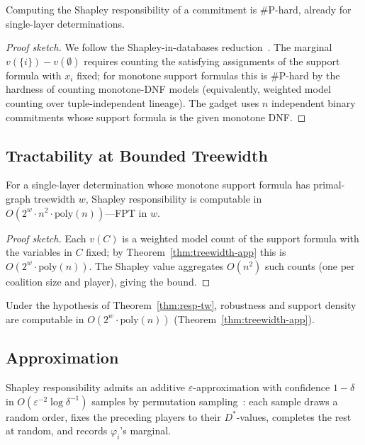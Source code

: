 \begin{theorem}[\#P-hardness]
  \label{thm:resp-hard}
  Computing the Shapley responsibility of a commitment is \#P-hard, already
  for single-layer determinations.
\end{theorem}
\begin{proof}[Proof sketch]
  We follow the Shapley-in-databases
  reduction~\cite{livshits2021shapley}. The marginal
  $v(\{i\}) - v(\emptyset)$ requires counting the satisfying assignments of
  the support formula with $x_i$ fixed; for monotone support formulas this is
  \#P-hard by the hardness of counting monotone-DNF models (equivalently,
  weighted model counting over tuple-independent lineage). The gadget uses $n$
  independent binary commitments whose support formula is the given monotone
  DNF.
\end{proof}

\subsection{Tractability at Bounded Treewidth}

\begin{theorem}
  \label{thm:resp-tw}
  For a single-layer determination whose monotone support formula has
  primal-graph treewidth $w$, Shapley responsibility is computable in
  $O(2^w \cdot n^2 \cdot \mathrm{poly}(n))$---FPT in $w$.
\end{theorem}
\begin{proof}[Proof sketch]
  Each $v(C)$ is a weighted model count of the support formula with the
  variables in $C$ fixed; by Theorem~\ref{thm:treewidth-app} this is
  $O(2^w \cdot \mathrm{poly}(n))$. The Shapley value aggregates
  $O(n^2)$ such counts (one per coalition size and player), giving the bound.
\end{proof}

\begin{corollary}
  \label{cor:robustness-fpt}
  Under the hypothesis of Theorem~\ref{thm:resp-tw}, robustness and support
  density are computable in $O(2^w \cdot \mathrm{poly}(n))$
  (Theorem~\ref{thm:treewidth-app}).
\end{corollary}

\subsection{Approximation}

\begin{proposition}
  \label{prop:resp-approx}
  Shapley responsibility admits an additive $\varepsilon$-approximation with
  confidence $1-\delta$ in $O(\varepsilon^{-2} \log \delta^{-1})$ samples by
  permutation sampling~\cite{shapley1953value,livshits2021shapley}: each
  sample draws a random order, fixes the preceding players to their
  $D^\ast$-values, completes the rest at random, and records
  $\varphi_i$'s marginal.
\end{proposition}

